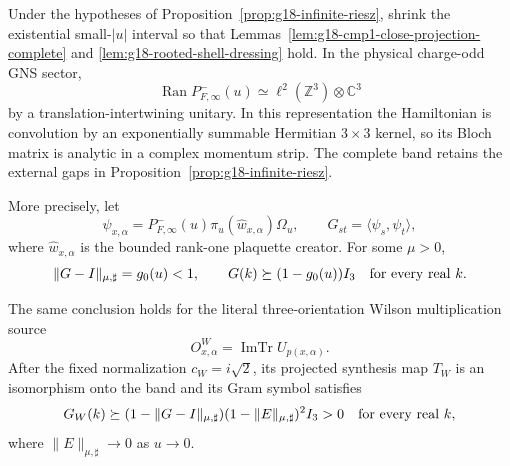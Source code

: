 \begin{theorem}
\label{thm:g18-fixed-spacing-band}
 Under the hypotheses of Proposition~\ref{prop:g18-infinite-riesz}, shrink
 the existential small-$|u|$ interval so that
 Lemmas~\ref{lem:g18-cmp1-close-projection-complete} and
 \ref{lem:g18-rooted-shell-dressing} hold.  In the physical charge-odd GNS
sector,
\begin{equation}
 \operatorname{Ran}P_{F,\infty}^-(u)
 \simeq \ell^2(\mathbb Z^3)\otimes\mathbb C^3
 \label{eq:g18-three-component-band}
\end{equation}
by a translation-intertwining unitary.  In this representation the
Hamiltonian is convolution by an exponentially summable Hermitian
$3\times3$ kernel, so its Bloch matrix is analytic in a complex momentum
strip.  The complete band retains the external gaps in
Proposition~\ref{prop:g18-infinite-riesz}.

More precisely, let
\[
 \psi_{x,\alpha}
 =P_{F,\infty}^-(u)\pi_u(\widehat w_{x,\alpha})\Omega_u,
 \qquad
 G_{st}=\langle\psi_s,\psi_t\rangle ,
\]
where $\widehat w_{x,\alpha}$ is the bounded rank-one plaquette creator.
For some $\mu>0$,
\begin{equation}
 \|G-I\|_{\mu,\sharp}=g_0(u)<1,\qquad
 G(k)\succeq(1-g_0(u))I_3
 \quad\hbox{for every real }k .
 \label{eq:g18-proved-canonical-frame}
\end{equation}

The same conclusion holds for the literal three-orientation Wilson
multiplication source
\[
 O^W_{x,\alpha}=\operatorname{ImTr}U_{p(x,\alpha)}.
\]
After the fixed normalization $c_W=i\sqrt2$, its projected synthesis map
$T_W$ is an isomorphism onto the band and its Gram symbol satisfies
\begin{equation}
 G_W(k)\succeq
 (1-\|G-I\|_{\mu,\sharp})
 (1-\|E\|_{\mu,\sharp})^2I_3>0
 \quad\hbox{for every real }k ,
 \label{eq:g18-wilson-frame}
\end{equation}
where $\|E\|_{\mu,\sharp}\to0$ as $u\to0$.
\end{theorem}


